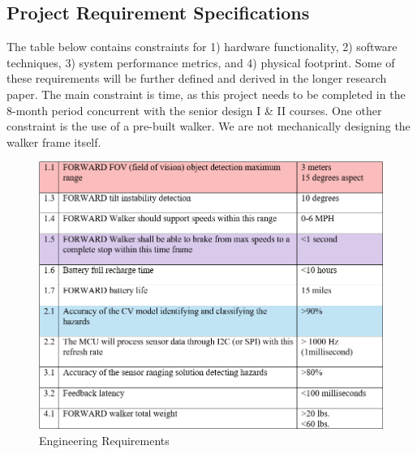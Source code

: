 \subsection{Project Requirement Specifications} \label{sec:req_spec}
\noindent The table below contains constraints for 1) hardware functionality, 2) software techniques, 3) system performance metrics, and 4) physical footprint. Some of these requirements will be further defined and derived in the longer research paper. The main constraint is time, as this project needs to be completed in the 8-month period concurrent with the senior design I \& II courses. One other constraint is the use of a pre-built walker. We are not mechanically designing the walker frame itself.

\begin{figure}[H]
	\centering
	\includegraphics[width=0.99925\textwidth]{./Images/EngineeringReq.png}
	\caption{\label{fig:Standards}Engineering Requirements}
\end{figure}